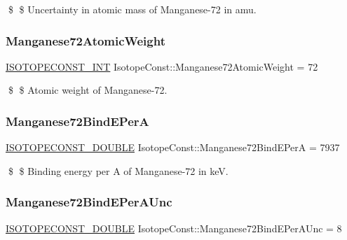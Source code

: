 \$ \$ Uncertainty in atomic mass of Manganese-\/72 in amu. \mbox{\label{group___isotope_const-_manganese-_mn72_ga1e1c91fea9f816c545f55ed500862f55}} 
\subsubsection{\texorpdfstring{Manganese72\+Atomic\+Weight}{Manganese72AtomicWeight}}
{\footnotesize\ttfamily \mbox{\hyperlink{group___isotope_const-_macros_ga5f18360b3e99483a35c32d789e62621c}{I\+S\+O\+T\+O\+P\+E\+C\+O\+N\+S\+T\+\_\+\+I\+NT}} Isotope\+Const\+::\+Manganese72\+Atomic\+Weight = 72}

\$ \$ Atomic weight of Manganese-\/72. \mbox{\label{group___isotope_const-_manganese-_mn72_ga82dae76712289c4253542c70638098f1}} 
\subsubsection{\texorpdfstring{Manganese72\+Bind\+E\+PerA}{Manganese72BindEPerA}}
{\footnotesize\ttfamily \mbox{\hyperlink{group___isotope_const-_macros_ga8f45a7272ce02c0b4c65c44636ed719a}{I\+S\+O\+T\+O\+P\+E\+C\+O\+N\+S\+T\+\_\+\+D\+O\+U\+B\+LE}} Isotope\+Const\+::\+Manganese72\+Bind\+E\+PerA = 7937}

\$ \$ Binding energy per A of Manganese-\/72 in keV. \mbox{\label{group___isotope_const-_manganese-_mn72_gab7d4c9c2a40098c5dabe3c2e6b3a3851}} 
\subsubsection{\texorpdfstring{Manganese72\+Bind\+E\+Per\+A\+Unc}{Manganese72BindEPerAUnc}}
{\footnotesize\ttfamily \mbox{\hyperlink{group___isotope_const-_macros_ga8f45a7272ce02c0b4c65c44636ed719a}{I\+S\+O\+T\+O\+P\+E\+C\+O\+N\+S\+T\+\_\+\+D\+O\+U\+B\+LE}} Isotope\+Const\+::\+Manganese72\+Bind\+E\+Per\+A\+Unc = 8}

